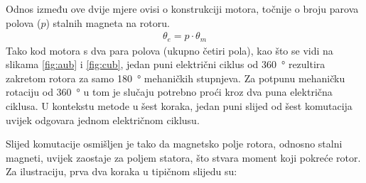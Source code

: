 \documentclass[diplomskirad]{fer}
\begin{document}
Odnos između ove dvije mjere ovisi o konstrukciji motora, točnije o broju parova polova ($p$) stalnih magneta na rotoru.
\begin{align}
	\theta_e = p \cdot \theta_m
\end{align}
Tako kod motora s dva para polova (ukupno četiri pola), kao što se vidi na slikama \ref{fig:aub} i \ref{fig:cub}, jedan puni električni ciklus od \SI{360}{\degree} rezultira zakretom rotora za samo \SI{180}{\degree} mehaničkih stupnjeva. Za potpunu mehaničku rotaciju od \SI{360}{\degree} u tom je slučaju potrebno proći kroz dva puna električna ciklusa. U kontekstu metode u šest koraka, jedan puni slijed od šest komutacija uvijek odgovara jednom električnom ciklusu.

\bigskip %
Slijed komutacije osmišljen je tako da magnetsko polje rotora, odnosno stalni
magneti, uvijek zaostaje za poljem statora, što stvara moment koji pokreće
rotor. Za ilustraciju, prva dva koraka u tipičnom slijedu su:
\end{document}
